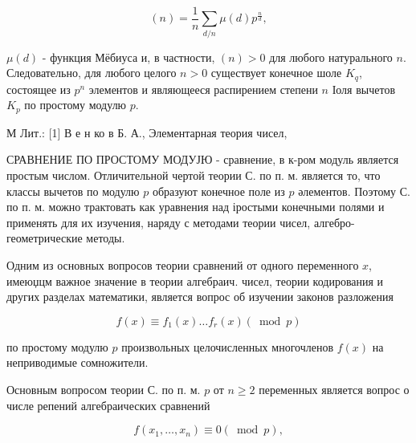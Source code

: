\documentclass[10pt]{article}
\begin{document}
\[

(n)=\frac{1}{n} \sum_{d / n} \mu(d) p^{\frac{n}{d}},

\]



$\mu(d)$ - функция Мёбиуса и, в частности, $(n)>0$ для любого натурального $n$. Следовательно, для любого целого $n>0$ существует конечное шоле $K_{q}$, состоящее из $p^{n}$ элементов и являющееся распирением степени $n$ Іоля вычетов $K_{p}$ по простому модулю $p$.



М Лит.: [1] В е н ко в Б. А., Элементарная теория чисел,



СРАВНЕНИЕ ПО ПРОСТОМУ МОДУЈЮ - сравнение, в к-ром модуль является простым числом. Отличительной чертой теории С. по п. м. является то, что классы вычетов по модулю $p$ образуют конечное поле из $p$ әлементов. Поэтому С. по п. м. можно трактовать как уравнения над іростыми конечными полями и применять для их изучения, наряду с методами теории чисел, алгебро-геометрические методы.



Одним из основных вопросов теории сравнений от одного переменного $x$, имеюџцм важное значение в теории алгебраич. чисел, теории кодирования и других разделах математики, является вопрос об изучении законов разложения



\[

f(x) \equiv f_{1}(x) \ldots f_{r}(x)(\bmod p)

\]



по простому модулю $p$ произвольных целочисленных многочленов $f(x)$ на неприводимые сомножители.



Основным вопросом теории С. по п. м. $p$ от $n \geqslant 2$ переменных является вопрос о числе репений алгебраических сравнений



\[

f\left(x_{1}, \ldots, x_{n}\right) \equiv 0(\bmod p),

\]
\end{document}
